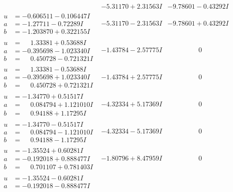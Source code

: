 \documentclass[1p]{elsarticle_modified}
\theoremstyle{definition}
\begin{document}
$$\begin{array}{c|c|c}
 & -5.31170 + 2.31563 I & -9.78601 - 0.43292 I \\ \hline\begin{aligned}
u &= -0.606511 - 0.106447 I \\
a &= -1.27711 - 0.72289 I \\
b &= -1.203870 + 0.322155 I\end{aligned}
 & -5.31170 - 2.31563 I & -9.78601 + 0.43292 I \\ \hline\begin{aligned}
u &= \phantom{-}1.33381 + 0.53688 I \\
a &= -0.395698 - 1.023340 I \\
b &= \phantom{-}0.450728 - 0.721321 I\end{aligned}
 & -1.43784 - 2.57775 I & \phantom{-0.000000 } 0 \\ \hline\begin{aligned}
u &= \phantom{-}1.33381 - 0.53688 I \\
a &= -0.395698 + 1.023340 I \\
b &= \phantom{-}0.450728 + 0.721321 I\end{aligned}
 & -1.43784 + 2.57775 I & \phantom{-0.000000 } 0 \\ \hline\begin{aligned}
u &= -1.34770 + 0.51517 I \\
a &= \phantom{-}0.084794 + 1.121010 I \\
b &= \phantom{-}0.94188 + 1.17295 I\end{aligned}
 & -4.32334 + 5.17369 I & \phantom{-0.000000 } 0 \\ \hline\begin{aligned}
u &= -1.34770 - 0.51517 I \\
a &= \phantom{-}0.084794 - 1.121010 I \\
b &= \phantom{-}0.94188 - 1.17295 I\end{aligned}
 & -4.32334 - 5.17369 I & \phantom{-0.000000 } 0 \\ \hline\begin{aligned}
u &= -1.35524 + 0.60281 I \\
a &= -0.192018 + 0.888477 I \\
b &= \phantom{-}0.701107 + 0.781403 I\end{aligned}
 & -1.80796 + 8.47959 I & \phantom{-0.000000 } 0 \\ \hline\begin{aligned}
u &= -1.35524 - 0.60281 I \\
a &= -0.192018 - 0.888477 I \\

\end{aligned}
\end{array}$$
\end{document}
